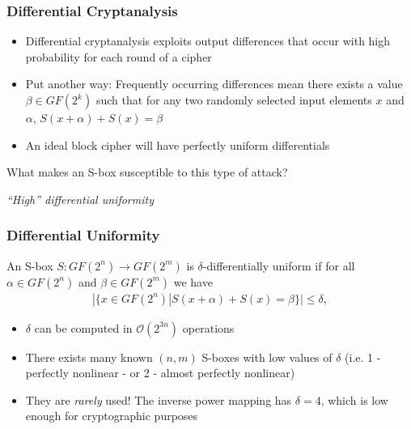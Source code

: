 \documentclass[handout,10pt]{beamer}
\begin{document}

\begin{frame}
	\frametitle{Differential Cryptanalysis}
	\begin{itemize}
		\item Differential cryptanalysis exploits output differences that occur with high probability for each round of a cipher

		\pause 
		\item Put another way: Frequently occurring differences mean there exists a value $\beta \in GF(2^k)$ such that for any two randomly selected input elements $x$ and $\alpha$, $S(x + \alpha) + S(x) = \beta$

		\pause
		\item An ideal block cipher will have perfectly uniform differentials
	\end{itemize}

	\pause
	\medskip
	What makes an S-box susceptible to this type of attack?

	\pause 
	\medskip

	\begin{center}
		\emph{``High'' differential uniformity}
	\end{center}
\end{frame}

\begin{frame}
	\frametitle{Differential Uniformity}
	An S-box $S : GF(2^n) \to GF(2^m)$ is $\delta$-differentially uniform if for all $\alpha \in GF(2^n)$ and $\beta \in GF(2^m)$ we have
	\begin{align*}
		|\{x \in GF(2^n) | S(x + \alpha) + S(x) = \beta\}| \leq \delta, 
	\end{align*}

	\medskip
	\pause
	\begin{itemize}
		\item $\delta$ can be computed in $\mathcal{O}(2^{3n})$ operations 
		\item There exists many known $(n, m)$ S-boxes with low values of $\delta$ (i.e. 1 - perfectly nonlinear - or 2 - almost perfectly nonlinear)
		\pause
		\item They are \emph{rarely} used! The inverse power mapping has $\delta = 4$, which is low enough for cryptographic purposes
	\end{itemize}
\end{frame}
\end{document}
